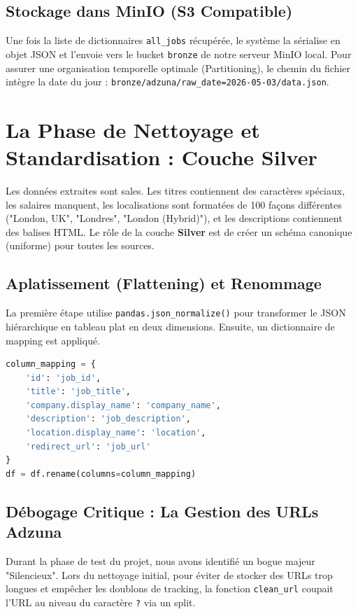 \documentclass[12pt,a4paper,twoside]{report}
\begin{document}
\subsection{Stockage dans MinIO (S3 Compatible)}
Une fois la liste de dictionnaires \texttt{all\_jobs} récupérée, le système la sérialise en objet JSON et l'envoie vers le bucket \texttt{bronze} de notre serveur MinIO local. Pour assurer une organisation temporelle optimale (Partitioning), le chemin du fichier intègre la date du jour : \texttt{bronze/adzuna/raw\_date=2026-05-03/data.json}.

\section{La Phase de Nettoyage et Standardisation : Couche Silver}
Les données extraites sont sales. Les titres contiennent des caractères spéciaux, les salaires manquent, les localisations sont formatées de 100 façons différentes ("London, UK", "Londres", "London (Hybrid)"), et les descriptions contiennent des balises HTML. 
Le rôle de la couche \textbf{Silver} est de créer un schéma canonique (uniforme) pour toutes les sources.

\subsection{Aplatissement (Flattening) et Renommage}
La première étape utilise \texttt{pandas.json\_normalize()} pour transformer le JSON hiérarchique en tableau plat en deux dimensions. Ensuite, un dictionnaire de mapping est appliqué.

\begin{lstlisting}[language=Python, caption=Standardisation des colonnes dans le cleaner Silver]
column_mapping = {
    'id': 'job_id',
    'title': 'job_title',
    'company.display_name': 'company_name',
    'description': 'job_description',
    'location.display_name': 'location',
    'redirect_url': 'job_url'
}
df = df.rename(columns=column_mapping)
\end{lstlisting}

\subsection{Débogage Critique : La Gestion des URLs Adzuna}
Durant la phase de test du projet, nous avons identifié un bogue majeur "Silencieux". Lors du nettoyage initial, pour éviter de stocker des URLs trop longues et empêcher les doublons de tracking, la fonction \texttt{clean\_url} coupait l'URL au niveau du caractère \texttt{?} via un split.
\end{document}
